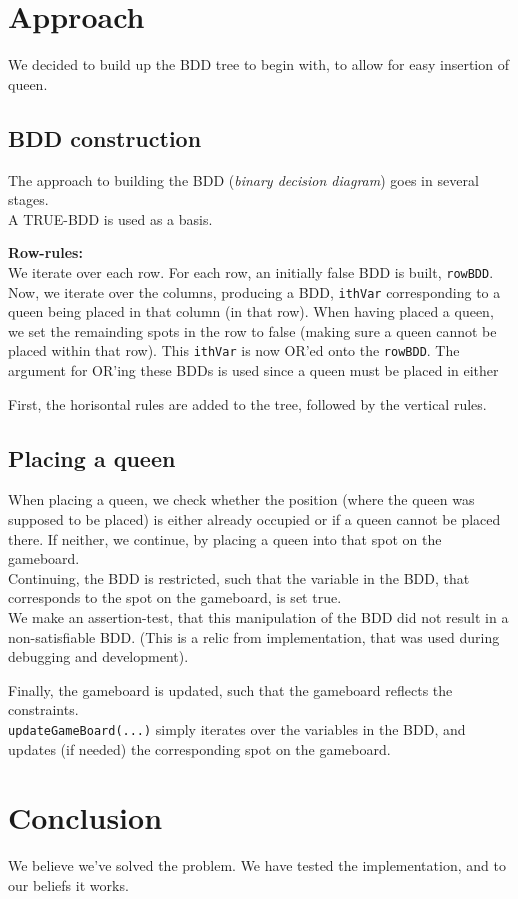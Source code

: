 \section{Approach}
We decided to build up the BDD tree to begin with, to allow for easy insertion of queen. 

\subsection{BDD construction}
The approach to building the BDD (\textit{binary decision diagram}) goes in several stages.\\
A TRUE-BDD is used as a basis. 

\textbf{Row-rules:}\\
We iterate over each row. For each row, an initially false BDD is built, \texttt{rowBDD}. Now, we iterate over the columns, producing a BDD, \texttt{ithVar} corresponding to a queen being placed in that column (in that row). When having placed a queen, we set the remainding spots in the row to false (making sure a queen cannot be placed within that row). This \texttt{ithVar} is now OR'ed onto the \texttt{rowBDD}. The argument for OR'ing these BDDs is used since a queen must be placed in either

First, the horisontal rules are added to the tree, followed by the vertical rules. 

\subsection{Placing a queen}
When placing a queen, we check whether the position (where the queen was supposed to be placed) is either already occupied or if a queen cannot be placed there. If neither, we continue, by placing a queen into that spot on the gameboard. \\

Continuing, the BDD is restricted, such that the variable in the BDD, that corresponds to the spot on the gameboard, is set true. \\

We make an assertion-test, that this manipulation of the BDD did not result in a non-satisfiable BDD. (This is a relic from implementation, that was used during debugging and development). 

Finally, the gameboard is updated, such that the gameboard reflects the constraints. \\

\texttt{updateGameBoard(...)} simply iterates over the variables in the BDD, and updates (if needed) the corresponding spot on the gameboard. 

\section{Conclusion}
We believe we've solved the problem. We have tested the implementation, and to our beliefs it works. 